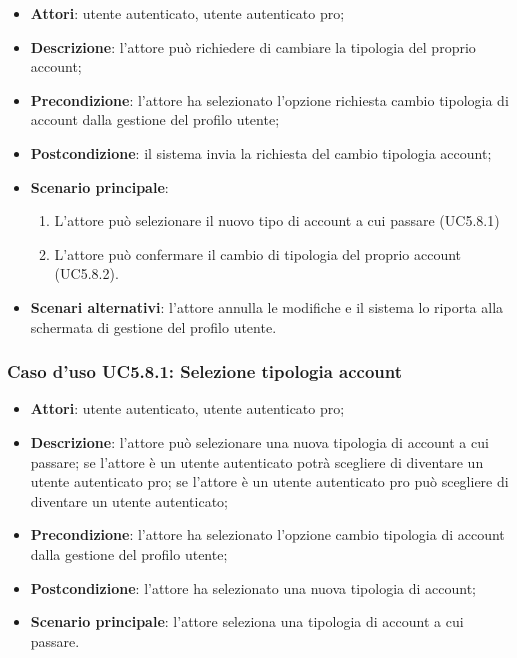 \begin{itemize}
	\item \textbf{Attori}: utente autenticato, utente autenticato pro;
	\item \textbf{Descrizione}: l'attore può richiedere di cambiare la tipologia del proprio account; 
	\item \textbf{Precondizione}:  l'attore ha selezionato l'opzione richiesta cambio tipologia di account dalla gestione del profilo utente;
	\item \textbf{Postcondizione}: il sistema invia la richiesta del cambio tipologia account;
	\item \textbf{Scenario principale}:
	\begin{enumerate}
		\item L'attore può selezionare il nuovo tipo di account a cui passare (UC5.8.1)
		\item L'attore può confermare il cambio di tipologia del proprio account (UC5.8.2).
	\end{enumerate}
	\item \textbf{Scenari alternativi}: l'attore annulla le modifiche e il sistema lo riporta alla schermata di gestione del profilo utente.
\end{itemize}

\subsubsection{Caso d'uso UC5.8.1: Selezione tipologia account}

\begin{itemize}
	\item \textbf{Attori}: utente autenticato, utente autenticato pro;
	\item \textbf{Descrizione}: l'attore può selezionare una nuova tipologia di account a cui passare; se l'attore è un utente autenticato potrà scegliere di diventare un utente autenticato pro; se l'attore è un utente autenticato pro può scegliere di diventare un utente autenticato;
	\item \textbf{Precondizione}: l'attore ha selezionato l'opzione cambio tipologia di account dalla gestione del profilo utente;
	\item \textbf{Postcondizione}: l'attore ha selezionato  una nuova tipologia di account;
	\item \textbf{Scenario principale}: l'attore seleziona una tipologia di account a cui passare.
\end{itemize}

